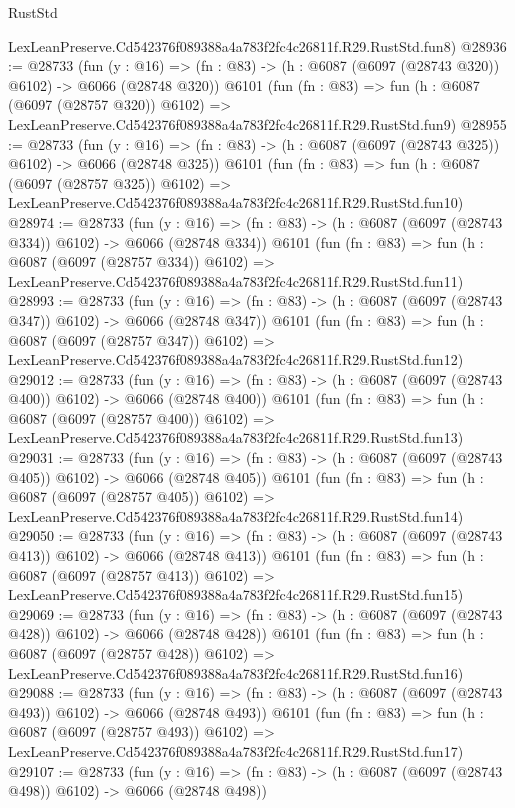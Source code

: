\begin{lexlean}{RustStd}
\begin{coremodule}
    LexLeanPreserve.Cd542376f089388a4a783f2fc4c26811f.R29.RustStd.fun8)
@28936 := @28733
    (fun (y : @16) => (fn : @83) -> (h : @6087 (@6097 (@28743 @320)) @6102) -> @6066 (@28748 @320))
    @6101
    (fun (fn : @83) =>
    fun (h : @6087 (@6097 (@28757 @320)) @6102) =>
    LexLeanPreserve.Cd542376f089388a4a783f2fc4c26811f.R29.RustStd.fun9)
@28955 := @28733
    (fun (y : @16) => (fn : @83) -> (h : @6087 (@6097 (@28743 @325)) @6102) -> @6066 (@28748 @325))
    @6101
    (fun (fn : @83) =>
    fun (h : @6087 (@6097 (@28757 @325)) @6102) =>
    LexLeanPreserve.Cd542376f089388a4a783f2fc4c26811f.R29.RustStd.fun10)
@28974 := @28733
    (fun (y : @16) => (fn : @83) -> (h : @6087 (@6097 (@28743 @334)) @6102) -> @6066 (@28748 @334))
    @6101
    (fun (fn : @83) =>
    fun (h : @6087 (@6097 (@28757 @334)) @6102) =>
    LexLeanPreserve.Cd542376f089388a4a783f2fc4c26811f.R29.RustStd.fun11)
@28993 := @28733
    (fun (y : @16) => (fn : @83) -> (h : @6087 (@6097 (@28743 @347)) @6102) -> @6066 (@28748 @347))
    @6101
    (fun (fn : @83) =>
    fun (h : @6087 (@6097 (@28757 @347)) @6102) =>
    LexLeanPreserve.Cd542376f089388a4a783f2fc4c26811f.R29.RustStd.fun12)
@29012 := @28733
    (fun (y : @16) => (fn : @83) -> (h : @6087 (@6097 (@28743 @400)) @6102) -> @6066 (@28748 @400))
    @6101
    (fun (fn : @83) =>
    fun (h : @6087 (@6097 (@28757 @400)) @6102) =>
    LexLeanPreserve.Cd542376f089388a4a783f2fc4c26811f.R29.RustStd.fun13)
@29031 := @28733
    (fun (y : @16) => (fn : @83) -> (h : @6087 (@6097 (@28743 @405)) @6102) -> @6066 (@28748 @405))
    @6101
    (fun (fn : @83) =>
    fun (h : @6087 (@6097 (@28757 @405)) @6102) =>
    LexLeanPreserve.Cd542376f089388a4a783f2fc4c26811f.R29.RustStd.fun14)
@29050 := @28733
    (fun (y : @16) => (fn : @83) -> (h : @6087 (@6097 (@28743 @413)) @6102) -> @6066 (@28748 @413))
    @6101
    (fun (fn : @83) =>
    fun (h : @6087 (@6097 (@28757 @413)) @6102) =>
    LexLeanPreserve.Cd542376f089388a4a783f2fc4c26811f.R29.RustStd.fun15)
@29069 := @28733
    (fun (y : @16) => (fn : @83) -> (h : @6087 (@6097 (@28743 @428)) @6102) -> @6066 (@28748 @428))
    @6101
    (fun (fn : @83) =>
    fun (h : @6087 (@6097 (@28757 @428)) @6102) =>
    LexLeanPreserve.Cd542376f089388a4a783f2fc4c26811f.R29.RustStd.fun16)
@29088 := @28733
    (fun (y : @16) => (fn : @83) -> (h : @6087 (@6097 (@28743 @493)) @6102) -> @6066 (@28748 @493))
    @6101
    (fun (fn : @83) =>
    fun (h : @6087 (@6097 (@28757 @493)) @6102) =>
    LexLeanPreserve.Cd542376f089388a4a783f2fc4c26811f.R29.RustStd.fun17)
@29107 := @28733
    (fun (y : @16) => (fn : @83) -> (h : @6087 (@6097 (@28743 @498)) @6102) -> @6066 (@28748 @498))

\end{coremodule}
\end{lexlean}
